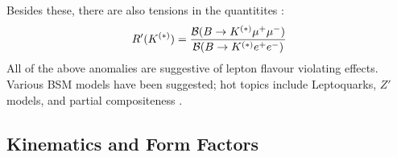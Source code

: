 \\ \\
Besides these, there are also tensions in the quantitites \cite{Altmannshofer:2017yso}:
\begin{align}
	R'(K^{(*)}) = {\mathcal{B}( B\to K^{(*)}\mu^+\mu^-)\over \mathcal{B}( B\to K^{(*)} e^+e^-)}
\end{align}
All of the above anomalies are suggestive of lepton flavour violating effects. Various BSM models have been suggested; hot topics include Leptoquarks, $Z'$ models, and partial compositeness \cite{Altmannshofer:2017yso}.

\subsection{Kinematics and Form Factors}
\label{sec:formfactors}

